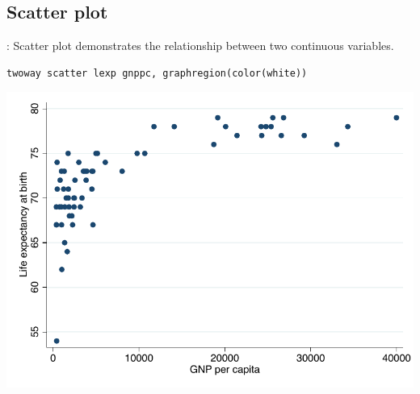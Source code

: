 \subsection{Scatter plot}
\begin{frame}[fragile]{\secname: \subsecname}
Scatter plot demonstrates the relationship between two continuous variables.
\begin{verbatim}
twoway scatter lexp gnppc, graphregion(color(white)) 
\end{verbatim}

\begin{center}
	\includegraphics[scale=0.5]{images/scatter}
\end{center}
\end{frame}

